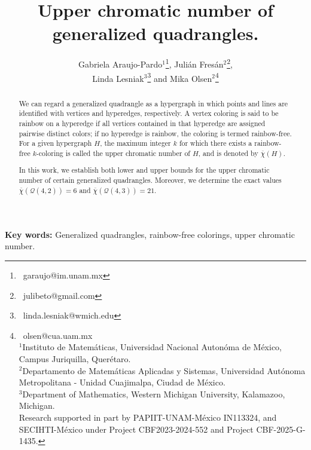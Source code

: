 \documentclass[12pt]{article}
\begin{document}
\title{Upper chromatic number of generalized quadrangles.}

\author{ 
Gabriela Araujo-Pardo$^1$\thanks{%
~garaujo@im.unam.mx}, 
Juli\'an Fres\'an$^2$\thanks{%
~julibeto@gmail.com},
\\
Linda Lesniak$^3$\thanks{%
~linda.lesniak@wmich.edu} 
and 
Mika Olsen$^2$\thanks{%
~olsen@cua.uam.mx\\ 
$^1${\small Instituto de Matem\'aticas, }
{\small Universidad Nacional Auton\'oma de M\'exico, }
{\small Campus Juriquilla, Quer\'etaro. }\\
$^2${\small Departamento de Matemáticas Aplicadas y Sistemas, }
{\small Universidad Aut\'onoma Metropolitana - Unidad Cuajimalpa, }
{\small Ciudad de M\'exico.}\\
$^3${\small Department of Mathematics, }
{\small Western Michigan University, }
{\small Kalamazoo, Michigan.}\\
{\small Research supported in part by PAPIIT-UNAM-M{\' e}xico IN113324, and  SECIHTI-M{\'e}xico under Project CBF2023-2024-552 and Project CBF-2025-G-1435.}}}
\maketitle

\begin{abstract}
We can regard a generalized quadrangle as a hypergraph in which points and lines are identified with vertices and hyperedges, respectively. A vertex coloring is said to be rainbow on a hyperedge if all vertices contained in that hyperedge are assigned pairwise distinct colors; if no hyperedge is rainbow, the coloring is termed rainbow-free. For a given hypergraph 
$H$, the maximum integer $k$ for which there exists a rainbow-free 
$k$-coloring is called the upper chromatic number of $H$, and is denoted by $\overline{\chi}(H)$.

In this work, we establish both lower and upper bounds for the upper chromatic number of certain generalized quadrangles. Moreover, we determine the exact values $\overline{\chi}(\mathcal{Q}(4,2))=6$ and $\overline{\chi}(\mathcal{Q}(4,3))=21$. 
\end{abstract}

{\bf{Key words:}} Generalized quadrangles, rainbow-free colorings, upper chromatic number. 

\end{document}
